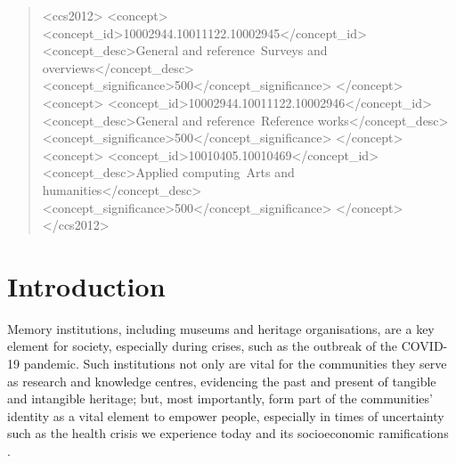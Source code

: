 \documentclass{egpubl}
\begin{document}
\begin{abstract}

\begin{CCSXML}
<ccs2012>
   <concept>
       <concept_id>10002944.10011122.10002945</concept_id>
       <concept_desc>General and reference~Surveys and overviews</concept_desc>
       <concept_significance>500</concept_significance>
       </concept>
   <concept>
       <concept_id>10002944.10011122.10002946</concept_id>
       <concept_desc>General and reference~Reference works</concept_desc>
       <concept_significance>500</concept_significance>
       </concept>
   <concept>
       <concept_id>10010405.10010469</concept_id>
       <concept_desc>Applied computing~Arts and humanities</concept_desc>
       <concept_significance>500</concept_significance>
       </concept>
 </ccs2012>
\end{CCSXML}


\printccsdesc   
\end{abstract}  
\section{Introduction}
\label{intro}
Memory institutions, including museums and heritage organisations, are a key element for society, especially during crises, such as the outbreak of the COVID-19 pandemic. Such institutions not only are vital for the communities they serve as research and knowledge centres, evidencing the past and present of tangible and intangible heritage; but, most importantly, form part of the communities' identity as a vital element to empower people, especially in times of uncertainty such as the health crisis we experience today and its socioeconomic ramifications \cite{ICOM:2020}.
\end{document}
